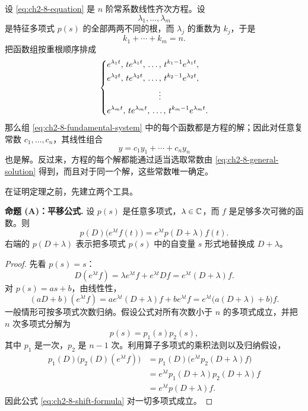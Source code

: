 \begin{theorem}[重根情形的基本解组]
\label{thm:ch2-5-repeated-roots}
 设 \eqref{eq:ch2-8-equation} 是 \(n\) 阶常系数线性齐次方程。设
 \[
  \lambda_1,\ldots,\lambda_m
 \]
 是特征多项式 \(p(s)\) 的全部两两不同的根，而 \(\lambda_j\) 的重数为 \(k_j\)，于是
 \[
  k_1+\cdots+k_m=n.
 \]
 把函数组按重根顺序排成
 \begin{equation}
 \left\{
 \begin{aligned}
  &e^{\lambda_1t},\,te^{\lambda_1t},\,\ldots,\,
   t^{k_1-1}e^{\lambda_1t},\\
  &e^{\lambda_2t},\,te^{\lambda_2t},\,\ldots,\,
   t^{k_2-1}e^{\lambda_2t},\\
  &\hspace{2.2cm}\vdots\\
  &e^{\lambda_mt},\,te^{\lambda_mt},\,\ldots,\,
   t^{k_m-1}e^{\lambda_mt}.
 \end{aligned}
 \right.
 \label{eq:ch2-8-fundamental-system}
 \end{equation}
 那么组 \eqref{eq:ch2-8-fundamental-system} 中的每个函数都是方程的解；因此对任意复常数 \(c_1,\ldots,c_n\)，其线性组合
 \begin{equation}
  y=c_1y_1+\cdots+c_ny_n
  \label{eq:ch2-8-general-solution}
 \end{equation}
 也是解。反过来，方程的每个解都能通过适当选取常数由 \eqref{eq:ch2-8-general-solution} 得到，而且对于同一个解，这些常数唯一确定。
\end{theorem}

在证明定理之前，先建立两个工具。

\medskip
\noindent\textbf{命题 (A)：平移公式.}
设 \(p(s)\) 是任意多项式，\(\lambda\in\mathbb C\)，而 \(f\) 是足够多次可微的函数。则
\begin{equation}
 p(D)\bigl(e^{\lambda t}f(t)\bigr)
 =e^{\lambda t}p(D+\lambda)f(t).
 \label{eq:ch2-8-shift-formula}
\end{equation}
右端的 \(p(D+\lambda)\) 表示把多项式 \(p(s)\) 中的自变量 \(s\) 形式地替换成 \(D+\lambda\)。

\begin{proof}
先看 \(p(s)=s\)：
\[
 D(e^{\lambda t}f)
 =\lambda e^{\lambda t}f+e^{\lambda t}Df
 =e^{\lambda t}(D+\lambda)f.
\]
对 \(p(s)=as+b\)，由线性性，
\[
 (aD+b)(e^{\lambda t}f)
 =ae^{\lambda t}(D+\lambda)f+be^{\lambda t}f
 =e^{\lambda t}\bigl(a(D+\lambda)+b\bigr)f.
\]
一般情形可按多项式次数归纳。假设公式对所有次数小于 \(n\) 的多项式成立，并把 \(n\) 次多项式分解为
\[
 p(s)=p_1(s)p_2(s),
\]
其中 \(p_1\) 是一次，\(p_2\) 是 \(n-1\) 次。利用算子多项式的乘积法则以及归纳假设，
\begin{align*}
 p_1(D)\bigl(p_2(D)(e^{\lambda t}f)\bigr)
 &=p_1(D)\bigl(e^{\lambda t}p_2(D+\lambda)f\bigr)\\
 &=e^{\lambda t}p_1(D+\lambda)p_2(D+\lambda)f\\
 &=e^{\lambda t}p(D+\lambda)f.
\end{align*}
因此公式 \eqref{eq:ch2-8-shift-formula} 对一切多项式成立。
\end{proof}

